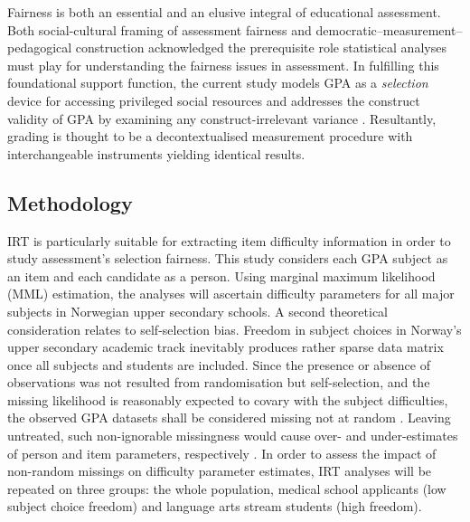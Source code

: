 
Fairness is both an essential and an elusive integral of educational assessment. Both  social-cultural framing of assessment fairness and  democratic--measurement--pedagogical construction acknowledged the prerequisite role statistical analyses must play for understanding the fairness issues in assessment. In fulfilling this foundational support function, the current study models GPA as a \emph{selection} device \parencite[IUA, ][]{kane:2013} for accessing privileged social resources \parencite{bourdieu:1973} and addresses the construct validity of GPA by examining any construct-irrelevant variance \parencite{messick:1989}. Resultantly, grading is thought to be a decontextualised measurement procedure \parencite{kalthoff:2013} with interchangeable instruments yielding identical results.

\subsection{Methodology}

IRT is particularly suitable for extracting item difficulty information in order to study assessment's selection fairness. This study considers each GPA subject as an item and each candidate as a person. Using marginal maximum likelihood (MML) estimation, the analyses will ascertain difficulty parameters for all major subjects in Norwegian upper secondary schools. A second theoretical consideration relates to self-selection bias. Freedom in subject choices in Norway's upper secondary academic track inevitably produces rather sparse data matrix once all subjects and students are included. Since the presence or absence of observations was not resulted from randomisation but self-selection, and the missing likelihood is reasonably expected to covary with the subject difficulties, the observed GPA datasets shall be considered missing not at random \parencite[MNAR,][]{rubin:1976}. Leaving untreated, such non-ignorable missingness would cause over- and under-estimates of person and item parameters, respectively \parencite{rose:2013}. In order to assess the impact of non-random missings on difficulty parameter estimates, IRT analyses will be repeated on three groups: the whole population, medical school applicants (low subject choice freedom) and language arts stream students (high freedom).

